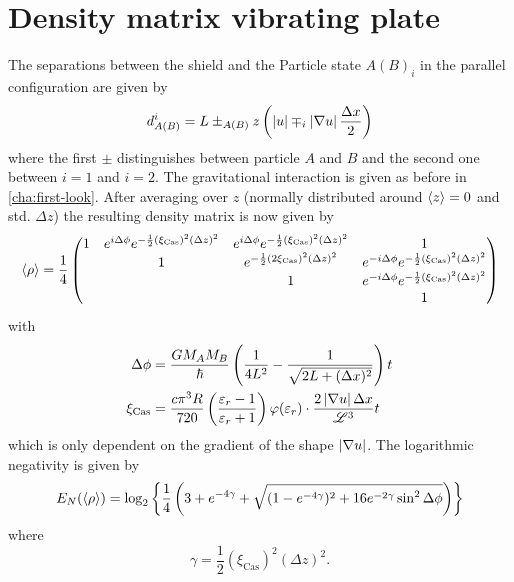\section{Density matrix vibrating plate} \label{apx:density-matrix-vibrating-plate}
The separations between the shield and the Particle state $A(B)_i$ in the parallel configuration are given by
\begin{equation}
  d^i_{A(B)} = L \pm_{A(B)} z \left(\left\lvert u\right\rvert \mp_i \left\lvert\nabla u\right\rvert \frac{\Delta x}{2}\right)
\end{equation}
where the first $\pm$ distinguishes between particle $A$ and $B$ and the second one between $i=1$ and $i=2$. The gravitational interaction is given as before in \cref{cha:first-look}.
After averaging over $z$ (normally distributed around $\left\langle z\right\rangle = 0$ and std. $\Delta z$) the resulting density matrix is now given by
\begin{equation}
  \left\langle\rho\right\rangle = \frac{1}{4} \begin{pmatrix}
    1 & e^{i \Delta \phi} e^{- \frac{1}{2} (\xi_\mathrm{Cas})^2 (\Delta z)^2} & e^{i \Delta \phi} e^{- \frac{1}{2} (\xi_\mathrm{Cas})^2 (\Delta z)^2} & 1 \\
    & 1 & e^{- \frac{1}{2} (2 \xi_\mathrm{Cas})^2 (\Delta z)^2} & e^{-i \Delta \phi} e^{- \frac{1}{2} (\xi_\mathrm{Cas})^2(\Delta z)^2} \\
    & & 1 & e^{-i \Delta \phi} e^{- \frac{1}{2} (\xi_\mathrm{Cas})^2 (\Delta z)^2} \\
    & & & 1
  \end{pmatrix}
\end{equation}
with
\begin{align}
  \Delta \phi &= \frac{G M_A M_B}{\hbar} \left(\frac{1}{4L^2} - \frac{1}{\sqrt{2L + (\Delta x)^2}}\right) t \\
  \xi_\mathrm{Cas} &= \frac{c \pi^3 R}{720} \left(\frac{\varepsilon_r - 1}{\varepsilon_r + 1}\right)\varphi(\varepsilon_r)\cdot \frac{2 \left\lvert\nabla u\right\rvert \Delta x}{\mathscr{L}^3} t
\end{align}
which is only dependent on the gradient of the shape $\left\lvert\nabla u\right\rvert$.
The logarithmic negativity is given by
\begin{equation}\label{eq:apx:en-thermal-shield}
  E_N(\left\langle\rho\right\rangle) = \log_2\left\{\frac{1}{4}\left(3 + e^{-4 \gamma}+\sqrt{(1-e^{-4\gamma})^2 + 16e^{-2\gamma}\sin^2\Delta\phi}\right)\right\}
\end{equation}
where 
\begin{equation}
  \gamma = \frac{1}{2}(\xi_\mathrm{Cas})^2(\Delta z)^2 .
\end{equation}


